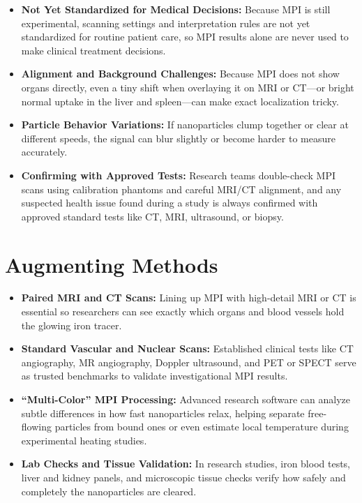 \begin{itemize}
    \item \textbf{Not Yet Standardized for Medical Decisions:} Because MPI is still experimental, scanning settings and interpretation rules are not yet standardized for routine patient care, so MPI results alone are never used to make clinical treatment decisions.
    \item \textbf{Alignment and Background Challenges:} Because MPI does not show organs directly, even a tiny shift when overlaying it on MRI or CT---or bright normal uptake in the liver and spleen---can make exact localization tricky.
    \item \textbf{Particle Behavior Variations:} If nanoparticles clump together or clear at different speeds, the signal can blur slightly or become harder to measure accurately.
    \item \textbf{Confirming with Approved Tests:} Research teams double-check MPI scans using calibration phantoms and careful MRI/CT alignment, and any suspected health issue found during a study is always confirmed with approved standard tests like CT, MRI, ultrasound, or biopsy.
\end{itemize}

\section{Augmenting Methods}

\begin{itemize}
    \item \textbf{Paired MRI and CT Scans:} Lining up MPI with high-detail MRI or CT is essential so researchers can see exactly which organs and blood vessels hold the glowing iron tracer.
    \item \textbf{Standard Vascular and Nuclear Scans:} Established clinical tests like CT angiography, MR angiography, Doppler ultrasound, and PET or SPECT serve as trusted benchmarks to validate investigational MPI results.
    \item \textbf{``Multi-Color'' MPI Processing:} Advanced research software can analyze subtle differences in how fast nanoparticles relax, helping separate free-flowing particles from bound ones or even estimate local temperature during experimental heating studies.
    \item \textbf{Lab Checks and Tissue Validation:} In research studies, iron blood tests, liver and kidney panels, and microscopic tissue checks verify how safely and completely the nanoparticles are cleared.
\end{itemize}


